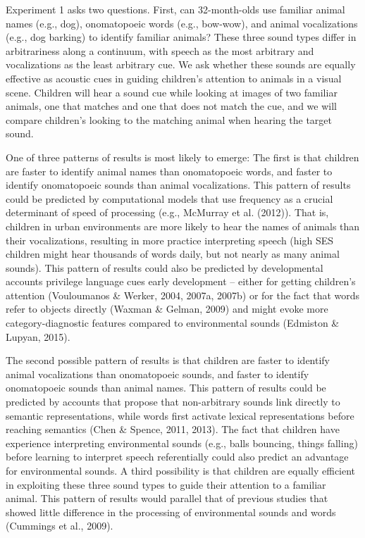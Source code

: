\documentclass[english,floatsintext,man]{apa6}
\theoremstyle{definition}
\theoremstyle{definition}
\theoremstyle{definition}
\theoremstyle{remark}
\begin{document}
Experiment 1 asks two questions. First, can 32-month-olds use familiar
animal names (e.g., dog), onomatopoeic words (e.g., bow-wow), and animal
vocalizations (e.g., dog barking) to identify familiar animals? These
three sound types differ in arbitrariness along a continuum, with speech
as the most arbitrary and vocalizations as the least arbitrary cue. We
ask whether these sounds are equally effective as acoustic cues in
guiding children's attention to animals in a visual scene. Children will
hear a sound cue while looking at images of two familiar animals, one
that matches and one that does not match the cue, and we will compare
children's looking to the matching animal when hearing the target sound.

One of three patterns of results is most likely to emerge: The first is
that children are faster to identify animal names than onomatopoeic
words, and faster to identify onomatopoeic sounds than animal
vocalizations. This pattern of results could be predicted by
computational models that use frequency as a crucial determinant of
speed of processing (e.g., McMurray et al. (2012)). That is, children in
urban environments are more likely to hear the names of animals than
their vocalizations, resulting in more practice interpreting speech
(high SES children might hear thousands of words daily, but not nearly
as many animal sounds). This pattern of results could also be predicted
by developmental accounts privilege language cues early development --
either for getting children's attention (Vouloumanos \& Werker, 2004,
2007a, 2007b) or for the fact that words refer to objects directly
(Waxman \& Gelman, 2009) and might evoke more category-diagnostic
features compared to environmental sounds (Edmiston \& Lupyan, 2015).

The second possible pattern of results is that children are faster to
identify animal vocalizations than onomatopoeic sounds, and faster to
identify onomatopoeic sounds than animal names. This pattern of results
could be predicted by accounts that propose that non-arbitrary sounds
link directly to semantic representations, while words first activate
lexical representations before reaching semantics (Chen \& Spence, 2011,
2013). The fact that children have experience interpreting environmental
sounds (e.g., balls bouncing, things falling) before learning to
interpret speech referentially could also predict an advantage for
environmental sounds. A third possibility is that children are equally
efficient in exploiting these three sound types to guide their attention
to a familiar animal. This pattern of results would parallel that of
previous studies that showed little difference in the processing of
environmental sounds and words (Cummings et al., 2009).
\end{document}
